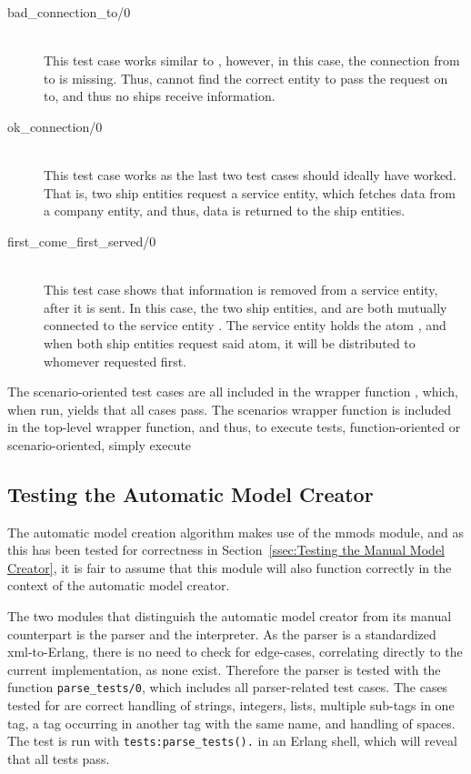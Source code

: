 \begin{description}
  \item[{bad\_connection\_to/0}]\ \\
    This test case works similar to , however, in this case, the connection from  to  is missing. Thus,  cannot find the correct entity to pass the request on to, and thus no ships receive information.
  \item[{ok\_connection/0}]\ \\
    This test case works as the last two test cases should ideally have worked. That is, two ship entities request a service entity, which fetches data from a company entity, and thus, data is returned to the ship entities.
  \item[{first\_come\_first\_served/0}]\ \\
    This test case shows that information is removed from a service entity, after it is sent. In this case, the two ship entities,  and  are both mutually connected to the service entity . The service entity holds the atom , and when both ship entities request said atom, it will be distributed to whomever requested first. 
\end{description}
\noindent
The scenario-oriented test cases are all included in the wrapper function , which, when run, yields that all cases pass. The scenarios wrapper function is included in the top-level wrapper function, and thus, to execute  tests, function-oriented or scenario-oriented, simply execute 

\subsection{Testing the Automatic Model Creator}

The automatic model creation algorithm makes use of the mmods module, and as this has been tested for correctness in Section~\ref{ssec:Testing the Manual Model Creator}, it is fair to assume that this module will also function correctly in the context of the automatic model creator. 

The two modules that distinguish the automatic model creator from its manual counterpart is the parser and the interpreter. As the parser is a standardized xml-to-Erlang, there is no need to check for edge-cases, correlating directly to the current implementation, as none exist. Therefore the parser is tested with the function \lstinline{parse_tests/0}, which includes all parser-related test cases. The cases tested for are correct handling of strings, integers, lists, multiple sub-tags in one tag, a tag occurring in another tag with the same name, and handling of spaces. The test is run with \lstinline{tests:parse_tests().} in an Erlang shell, which will reveal that all tests pass.

